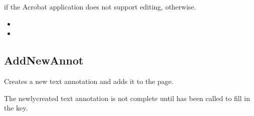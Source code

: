 \documentclass[letterpaper,12pt,english,openany,oneside]{sphinxmanual}
\begin{document}

 if the Acrobat application does not support editing,  otherwise.

\label{\detokenize{IAC_API_OLE_Objects:related-methods-112}}
\begin{itemize}
\item {} 
 

\item {} 
 

\end{itemize}




\subsection{AddNewAnnot}
\label{\detokenize{IAC_API_OLE_Objects:addnewannot}}
Creates a new text annotation and adds it to the page.

The newly\sphinxhyphen{}created text annotation is not complete until   has been called to fill in the  key.


\begin{sphinxVerbatim}[commandchars=\\\{\}]
    

                  
\end{sphinxVerbatim}
\label{\detokenize{IAC_API_OLE_Objects:parameters-68}}
\end{document}
